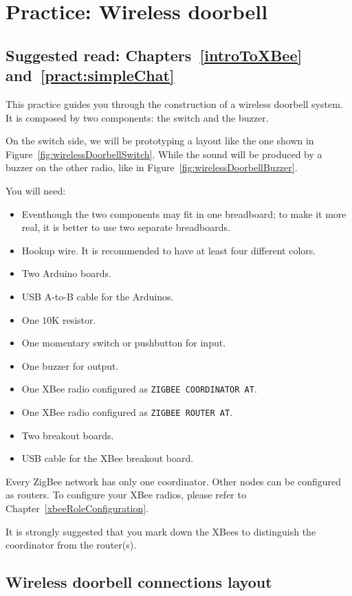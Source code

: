 \chapter{Practice: Wireless doorbell}\label{pract:wirelessDoorbell}
\section*{Suggested read: Chapters~\ref{introToXBee} and~\ref{pract:simpleChat}}

This practice guides you through the construction of a wireless doorbell system. It is composed by two components: the switch and the buzzer.

On the switch side, we will be prototyping a layout like the one shown in Figure~\ref{fig:wirelessDoorbellSwitch}. While the sound will be produced by a buzzer on the other radio, like in Figure~\ref{fig:wirelessDoorbellBuzzer}.

You will need:

\begin{itemize}
  \item Eventhough the two components may fit in one breadboard; to make it more real, it is better to use two separate breadboards.
  \item Hookup wire. It is recommended to have at least four different colors.
  \item Two Arduino boards.
  \item USB A-to-B cable for the Arduinos.
  \item One $10$K resistor.
  \item One momentary switch or pushbutton for input.
  \item One buzzer for output.
  \item One XBee radio configured as \texttt{ZIGBEE COORDINATOR AT}.
  \item One XBee radio configured as \texttt{ZIGBEE ROUTER AT}.
  \item Two breakout boards.
  \item USB cable for the XBee breakout board.
\end{itemize}

Every ZigBee network has only one coordinator. Other nodes can be configured as routers. To configure your XBee radios, please refer to Chapter~\ref{xbeeRoleConfiguration}.

It is strongly suggested that you mark down the XBees to distinguish the coordinator from the router(s).

\section{Wireless doorbell connections layout}

